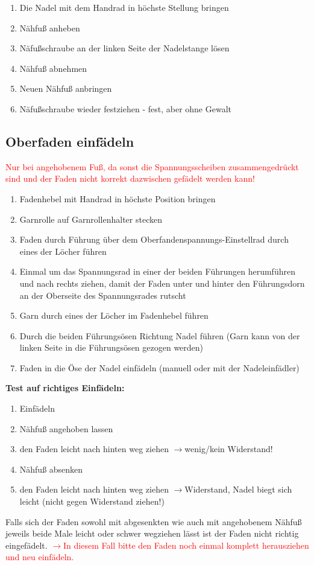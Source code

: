 \documentclass{\basedir/fablab-document}
\newcommand{\pfeil}{\ensuremath{\rightarrow}}
\begin{document}
\begin{enumerate}
	\item Die Nadel mit dem Handrad in höchste Stellung bringen
	\item Nähfuß anheben
	\item Näfußschraube an der linken Seite der Nadelstange lösen
	\item Nähfuß abnehmen
	\item Neuen Nähfuß anbringen
	\item Näfußschraube wieder festziehen - fest, aber ohne Gewalt
\end{enumerate}

\subsection{Oberfaden einfädeln}
\textcolor{red}{Nur bei angehobenem Fuß, da sonst die Spannungsscheiben zusammengedrückt sind und der Faden nicht korrekt dazwischen gefädelt werden kann!}
\newline

\begin{enumerate}
	\item Fadenhebel mit Handrad in höchste Position bringen
	\item Garnrolle auf Garnrollenhalter stecken
	\item Faden durch Führung über dem Oberfandenspannungs-Einstellrad durch eines der Löcher führen
	\item Einmal um das Spannungsrad in einer der beiden Führungen herumführen und nach rechts ziehen, damit der Faden unter und hinter den Führungsdorn an der Oberseite des Spannungsrades rutscht 
	\item Garn durch eines der Löcher im Fadenhebel führen
	\item Durch die beiden Führungsösen Richtung Nadel führen (Garn kann von der linken Seite in die Führungsösen gezogen werden)
	\item Faden in die Öse der Nadel einfädeln (manuell oder mit der Nadeleinfädler)
\end{enumerate}

\vspace{2em}

\textbf{Test auf richtiges Einfädeln:}
\begin{enumerate}
 \item Einfädeln
 \item Nähfuß angehoben lassen
 \item den Faden leicht nach hinten weg ziehen \pfeil wenig/kein Widerstand!
 \item Nähfuß absenken
 \item den Faden leicht nach hinten weg ziehen \pfeil Widerstand, Nadel biegt sich leicht (nicht gegen Widerstand ziehen!)
\end{enumerate}
Falls sich der Faden sowohl mit abgesenkten wie auch mit angehobenem Nähfuß jeweils beide Male leicht oder schwer wegziehen lässt ist der Faden nicht richtig eingefädelt.
\newline
\textcolor{red}{\pfeil In diesem Fall bitte den Faden noch einmal komplett herausziehen und neu einfädeln.} 
\end{document}
